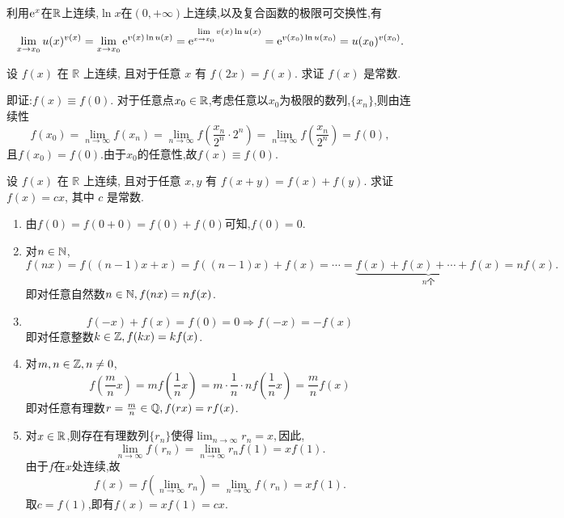 \begin{solution}
    利用$\mathrm{e}^x$在$\mathbb{R}$上连续,$\ln x$在$(0,+\infty)$上连续,以及复合函数的极限可交换性,有
    $$\lim_{x \to x_0} u(x)^{v(x)} = \lim_{x \to x_0} \mathrm{e}^{v(x) \ln u(x)} = \mathrm{e}^{\lim\limits_{x \to x_0} v(x) \ln u(x)} = \mathrm{e}^{v(x_0) \ln u(x_0)} = u(x_0)^{v(x_0)}.$$
\end{solution}

\begin{exercise}[2.1.14]
    设 $f(x)$ 在 $\mathbb{R}$ 上连续, 且对于任意 $x$ 有 $f(2x)=f(x)$. 求证 $f(x)$ 是常数.
\end{exercise}

\begin{solution}
    即证:$f(x) \equiv f(0)$. 对于任意点$x_0 \in \mathbb{R}$,考虑任意以$x_0$为极限的数列,$\{x_n\}$,则由连续性$$f(x_0)=\lim_{n \to \infty} f(x_n) = \lim_{n \to \infty} f \left( \frac{x_n}{2^n} \cdot 2^n \right) = \lim_{n \to \infty} f\left(\frac{x_n}{2^n}\right) = f(0),$$且$f(x_0) = f(0).$由于$x_0$的任意性,故$f(x) \equiv f(0)$.
\end{solution}

\begin{exercise}[2.1.15]
    设 $f(x)$ 在 $\mathbb{R}$ 上连续, 且对于任意 $x,y$ 有 $f(x+y)=f(x)+f(y)$. 求证 $f(x)=cx$, 其中 $c$ 是常数.
\end{exercise}

\begin{solution}
    \begin{enumerate}
        \item 由$f(0) = f(0+0) = f(0)+f(0)$可知,$f(0) = 0$.
        \item 对$n\in \mathbb{N}$,$$f(nx)=f((n-1)x+x)=f((n-1)x)+f(x)=\cdots = \underset{n\text{个}}{\underbrace{f(x)+f(x)+\cdots +f(x)}}=nf(x).$$
        即对任意自然数$n\in \mathbb{N},f(nx)=nf(x)$.
        \item $$f(-x) + f(x) = f(0) = 0\Rightarrow f(-x) = -f(x)$$
        即对任意整数$k\in \mathbb{Z},f(kx)=kf(x)$.
        \item 对$m,n\in \mathbb{Z},n\neq 0$,$$f\left(\frac{m}{n}x\right) = mf\left(\frac{1}{n}x\right) = m\cdot\frac{1}{n}\cdot nf\left(\frac{1}{n}x\right)=\frac{m}{n}f\left(x\right)$$
        即对任意有理数$r=\frac{m}{n}\in \mathbb{Q},f(rx)=rf(x)$.
        \item 对$x \in \mathbb{R}$,则存在有理数列$\{r_n\}$使得$\lim_{n \to \infty} r_n = x,$因此,$$\lim_{n \to \infty} f(r_n) = \lim_{n \to \infty} r_n f(1) = x f(1).$$
        由于$f$在$x$处连续,故$$f(x)=f(\lim_{n \to \infty} r_n ) =\lim_{n \to \infty} f(r_n) = x f(1).$$
        取$c=f(1)$,即有$f(x)=xf(1)=cx.$
    \end{enumerate}
\end{solution}

